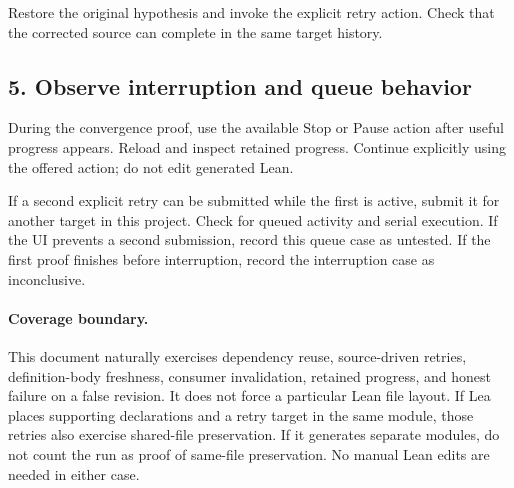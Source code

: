 \documentclass[11pt]{article}
\begin{document}
Restore the original hypothesis and invoke the explicit retry action.
Check that the corrected source can complete in the same target history.

\subsection*{5. Observe interruption and queue behavior}
During the convergence proof, use the available Stop or Pause action
after useful progress appears. Reload and inspect retained progress.
Continue explicitly using the offered action; do not edit generated Lean.

If a second explicit retry can be submitted while the first is active,
submit it for another target in this project. Check for queued activity
and serial execution. If the UI prevents a second submission, record this
queue case as untested. If the first proof finishes before interruption,
record the interruption case as inconclusive.

\paragraph{Coverage boundary.}
This document naturally exercises dependency reuse, source-driven retries,
definition-body freshness, consumer invalidation, retained progress, and
honest failure on a false revision. It does not force a particular Lean file
layout. If Lea places supporting declarations and a retry target in the
same module, those retries also exercise shared-file preservation.
If it generates separate modules, do not count the run as proof of
same-file preservation. No manual Lean edits are needed in either case.
\end{document}
